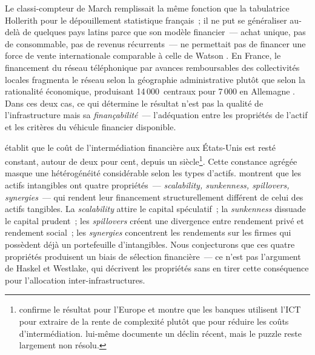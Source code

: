 Le classi-compteur de March remplissait la même fonction que la tabulatrice Hollerith pour le dépouillement statistique français~; il ne put se généraliser au-delà de quelques pays latins parce que son modèle financier~--- achat unique, pas de consommable, pas de revenus récurrents~--- ne permettait pas de financer une force de vente internationale comparable à celle de Watson \parencite{cortada_before_1993}. En France, le financement du réseau téléphonique par \og avances remboursables\fg{} des collectivités locales fragmenta le réseau selon la géographie administrative plutôt que selon la rationalité économique, produisant 14\,000~centraux pour 7\,000 en Allemagne \parencite{bertho_histoire_1984}. Dans ces deux cas, ce qui détermine le résultat n'est pas la qualité de l'infrastructure mais sa \emph{finançabilité}~--- l'adéquation entre les propriétés de l'actif et les critères du véhicule financier disponible.

\markNEO \textcite{philippon_has_2015} établit que le coût de l'intermédiation financière aux États-Unis est resté constant, autour de deux pour cent, depuis un siècle\footnote{\textcite{bazot_financial_2018} confirme le résultat pour l'Europe et montre que les banques utilisent l'ICT pour extraire de la rente de complexité plutôt que pour réduire les coûts d'intermédiation. \textcite{philippon_has_2015} lui-même documente un déclin récent, mais le puzzle reste largement non résolu.}. Cette constance agrégée masque une hétérogénéité considérable selon les types d'actifs. \textcite{haskel_capitalism_2018} montrent que les actifs intangibles ont quatre propriétés~--- \emph{scalability, sunkenness, spillovers, synergies}~--- qui rendent leur financement structurellement différent de celui des actifs tangibles. La \emph{scalability} attire le capital spéculatif~; la \emph{sunkenness} dissuade le capital prudent~; les \emph{spillovers} créent une divergence entre rendement privé et rendement social~; les \emph{synergies} concentrent les rendements sur les firmes qui possèdent déjà un portefeuille d'intangibles. Nous conjecturons que ces quatre propriétés produisent un biais de sélection financière~--- ce n'est pas l'argument de Haskel et Westlake, qui décrivent les propriétés sans en tirer cette conséquence pour l'allocation inter-infrastructures.

